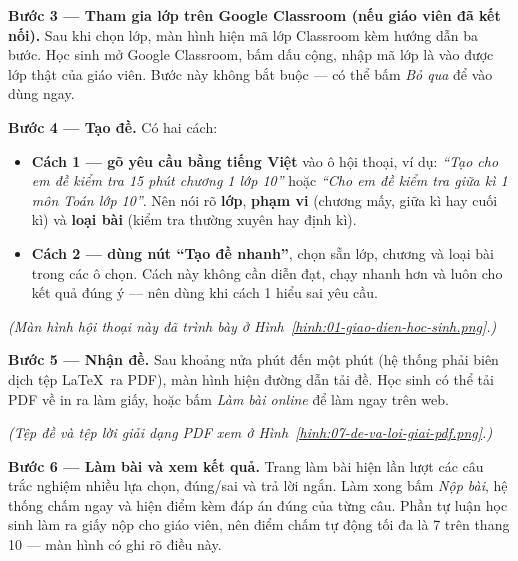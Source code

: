 
\textbf{Bước 3 --- Tham gia lớp trên Google Classroom (nếu giáo viên đã kết
nối).} Sau khi chọn lớp, màn hình hiện mã lớp Classroom kèm hướng dẫn ba bước.
Học sinh mở Google Classroom, bấm dấu cộng, nhập mã lớp là vào được lớp thật
của giáo viên. Bước này không bắt buộc --- có thể bấm \textit{Bỏ qua} để vào
dùng ngay.


\textbf{Bước 4 --- Tạo đề.} Có hai cách:

\begin{itemize}[leftmargin=1.2cm, itemsep=3pt]
  \item \textbf{Cách 1 --- gõ yêu cầu bằng tiếng Việt} vào ô hội thoại, ví dụ:
        \textit{``Tạo cho em đề kiểm tra 15 phút chương 1 lớp 10''} hoặc
        \textit{``Cho em đề kiểm tra giữa kì 1 môn Toán lớp 10''}. Nên nói rõ
        \textbf{lớp}, \textbf{phạm vi} (chương mấy, giữa kì hay cuối kì) và
        \textbf{loại bài} (kiểm tra thường xuyên hay định kì).
  \item \textbf{Cách 2 --- dùng nút ``Tạo đề nhanh''}, chọn sẵn lớp, chương và
        loại bài trong các ô chọn. Cách này không cần diễn đạt, chạy nhanh hơn
        và luôn cho kết quả đúng ý --- nên dùng khi cách 1 hiểu sai yêu cầu.
\end{itemize}

\noindent\textit{(Màn hình hội thoại này đã trình bày ở Hình~\ref{hinh:01-giao-dien-hoc-sinh.png}.)}


\textbf{Bước 5 --- Nhận đề.} Sau khoảng nửa phút đến một phút (hệ thống phải
biên dịch tệp \LaTeX\ ra PDF), màn hình hiện đường dẫn tải đề. Học sinh có thể
tải PDF về in ra làm giấy, hoặc bấm \textit{Làm bài online} để làm ngay trên
web.

\noindent\textit{(Tệp đề và tệp lời giải dạng PDF xem ở Hình~\ref{hinh:07-de-va-loi-giai-pdf.png}.)}

\textbf{Bước 6 --- Làm bài và xem kết quả.} Trang làm bài hiện lần lượt các câu
trắc nghiệm nhiều lựa chọn, đúng/sai và trả lời ngắn. Làm xong bấm \textit{Nộp
bài}, hệ thống chấm ngay và hiện điểm kèm đáp án đúng của từng câu. Phần tự
luận học sinh làm ra giấy nộp cho giáo viên, nên điểm chấm tự động tối đa là 7
trên thang 10 --- màn hình có ghi rõ điều này.

